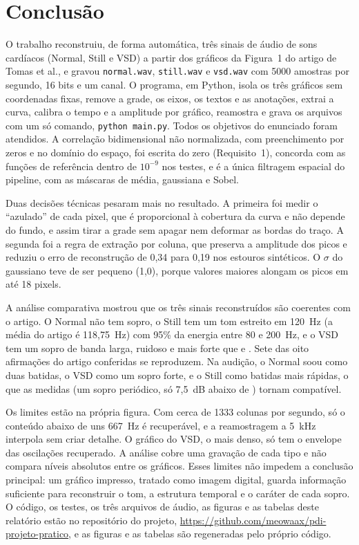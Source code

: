 \section{Conclusão}

O trabalho reconstruiu, de forma automática, três sinais de áudio de sons cardíacos (Normal, Still e VSD) a partir dos gráficos da Figura~1 do artigo de Tomas et al., e gravou \texttt{normal.wav}, \texttt{still.wav} e \texttt{vsd.wav} com 5000 amostras por segundo, 16 bits e um canal. O programa, em Python, isola os três gráficos sem coordenadas fixas, remove a grade, os eixos, os textos e as anotações, extrai a curva, calibra o tempo e a amplitude por gráfico, reamostra e grava os arquivos com um só comando, \texttt{python main.py}. Todos os objetivos do enunciado foram atendidos. A correlação bidimensional não normalizada, com preenchimento por zeros e no domínio do espaço, foi escrita do zero (Requisito~1), concorda com as funções de referência dentro de $10^{-9}$ nos testes, e é a única filtragem espacial do pipeline, com as máscaras de média, gaussiana e Sobel.

Duas decisões técnicas pesaram mais no resultado. A primeira foi medir o ``azulado'' de cada pixel, que é proporcional à cobertura da curva e não depende do fundo, e assim tirar a grade sem apagar nem deformar as bordas do traço. A segunda foi a regra de extração por coluna, que preserva a amplitude dos picos e reduziu o erro de reconstrução de 0,34 para 0,19 nos estouros sintéticos. O $\sigma$ do gaussiano teve de ser pequeno (1,0), porque valores maiores alongam os picos em até 18 pixels.

A análise comparativa mostrou que os três sinais reconstruídos são coerentes com o artigo. O Normal não tem sopro, o Still tem um tom estreito em 120~Hz (a média do artigo é 118,75~Hz) com 95\% da energia entre 80 e 200~Hz, e o VSD tem um sopro de banda larga, ruidoso e mais forte que \Sone{} e \Stwo. Sete das oito afirmações do artigo conferidas se reproduzem. Na audição, o Normal soou como duas batidas, o VSD como um sopro forte, e o Still como batidas mais rápidas, o que as medidas (um sopro periódico, só 7,5~dB abaixo de \Sone) tornam compatível.

Os limites estão na própria figura. Com cerca de 1333 colunas por segundo, só o conteúdo abaixo de uns 667~Hz é recuperável, e a reamostragem a 5~kHz interpola sem criar detalhe. O gráfico do VSD, o mais denso, só tem o envelope das oscilações recuperado. A análise cobre uma gravação de cada tipo e não compara níveis absolutos entre os gráficos. Esses limites não impedem a conclusão principal: um gráfico impresso, tratado como imagem digital, guarda informação suficiente para reconstruir o tom, a estrutura temporal e o caráter de cada sopro. O código, os testes, os três arquivos de áudio, as figuras e as tabelas deste relatório estão no repositório do projeto, \url{https://github.com/meowaax/pdi-projeto-pratico}, e as figuras e as tabelas são regeneradas pelo próprio código.
